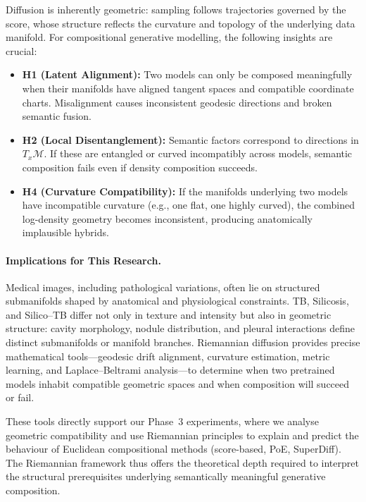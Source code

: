 Diffusion is inherently geometric: sampling follows trajectories governed by
the score, whose structure reflects the curvature and topology of the underlying
data manifold. For compositional generative modelling, the following insights
are crucial:
\begin{itemize}
    \item \textbf{H1 (Latent Alignment):} Two models can only be composed
          meaningfully when their manifolds have aligned tangent spaces and
          compatible coordinate charts. Misalignment causes inconsistent geodesic
          directions and broken semantic fusion.
    \item \textbf{H2 (Local Disentanglement):} Semantic factors correspond to
          directions in $T_x \mathcal{M}$. If these are entangled or curved
          incompatibly across models, semantic composition fails even if density
          composition succeeds.
    \item \textbf{H4 (Curvature Compatibility):} If the manifolds underlying two
          models have incompatible curvature (e.g., one flat, one highly curved),
          the combined log-density geometry becomes inconsistent, producing
          anatomically implausible hybrids.
\end{itemize}

\paragraph{Implications for This Research.}

Medical images, including pathological variations, often lie on structured
submanifolds shaped by anatomical and physiological constraints. TB, Silicosis,
and Silico–TB differ not only in texture and intensity but also in geometric
structure: cavity morphology, nodule distribution, and pleural interactions
define distinct submanifolds or manifold branches. Riemannian diffusion provides
precise mathematical tools—geodesic drift alignment, curvature estimation,
metric learning, and Laplace–Beltrami analysis—to determine when two pretrained
models inhabit compatible geometric spaces and when composition will succeed or
fail.

These tools directly support our Phase~3 experiments, where we analyse geometric
compatibility and use Riemannian principles to explain and predict the behaviour
of Euclidean compositional methods (score-based, PoE, SuperDiff). The
Riemannian framework thus offers the theoretical depth required to interpret the
structural prerequisites underlying semantically meaningful generative
composition.
